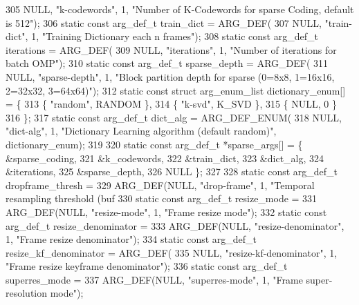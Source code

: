 \begin{DoxyCodeInclude}
{{305     NULL, \textcolor{stringliteral}{"k-codewords"}, 1, \textcolor{stringliteral}{"Number of K-Codewords for sparse Coding, default is 512"});
306 \textcolor{keyword}{static} \textcolor{keyword}{const} arg\_def\_t train\_dict = ARG\_DEF(
307     NULL, \textcolor{stringliteral}{"train-dict"}, 1, \textcolor{stringliteral}{"Training Dictionary each n frames"});
308 \textcolor{keyword}{static} \textcolor{keyword}{const} arg\_def\_t iterations = ARG\_DEF(
309     NULL, \textcolor{stringliteral}{"iterations"}, 1, \textcolor{stringliteral}{"Number of iterations for batch OMP"});
310 \textcolor{keyword}{static} \textcolor{keyword}{const} arg\_def\_t sparse\_depth = ARG\_DEF(
311     NULL, \textcolor{stringliteral}{"sparse-depth"}, 1, \textcolor{stringliteral}{"Block partition depth for sparse (0=8x8, 1=16x16, 2=32x32, 3=64x64)"});
312 \textcolor{keyword}{static} \textcolor{keyword}{const} \textcolor{keyword}{struct }arg\_enum\_list dictionary\_enum[] = \{
313     \{ \textcolor{stringliteral}{"random"}, RANDOM \},
314     \{ \textcolor{stringliteral}{"k-svd"}, K\_SVD \},
315     \{ NULL, 0 \}
316 \};
317 \textcolor{keyword}{static} \textcolor{keyword}{const} arg\_def\_t  dict\_alg = ARG\_DEF\_ENUM(
318     NULL, \textcolor{stringliteral}{"dict-alg"}, 1, \textcolor{stringliteral}{"Dictionary Learning algorithm (default random)"}, dictionary\_enum);
319 
320 \textcolor{keyword}{static} \textcolor{keyword}{const} arg\_def\_t *sparse\_args[] = \{ &sparse\_coding,
321     &k\_codewords,
322     &train\_dict,
323     &dict\_alg,
324     &iterations,
325     &sparse\_depth,
326     NULL \};
327 
328 \textcolor{keyword}{static} \textcolor{keyword}{const} arg\_def\_t dropframe\_thresh =
329     ARG\_DEF(NULL, \textcolor{stringliteral}{"drop-frame"}, 1, \textcolor{stringliteral}{"Temporal resampling threshold (buf %
330 \textcolor{keyword}{static} \textcolor{keyword}{const} arg\_def\_t resize\_mode =
331     ARG\_DEF(NULL, \textcolor{stringliteral}{"resize-mode"}, 1, \textcolor{stringliteral}{"Frame resize mode"});
332 \textcolor{keyword}{static} \textcolor{keyword}{const} arg\_def\_t resize\_denominator =
333     ARG\_DEF(NULL, \textcolor{stringliteral}{"resize-denominator"}, 1, \textcolor{stringliteral}{"Frame resize denominator"});
334 \textcolor{keyword}{static} \textcolor{keyword}{const} arg\_def\_t resize\_kf\_denominator = ARG\_DEF(
335     NULL, \textcolor{stringliteral}{"resize-kf-denominator"}, 1, \textcolor{stringliteral}{"Frame resize keyframe denominator"});
336 \textcolor{keyword}{static} \textcolor{keyword}{const} arg\_def\_t superres\_mode =
337     ARG\_DEF(NULL, \textcolor{stringliteral}{"superres-mode"}, 1, \textcolor{stringliteral}{"Frame super-resolution mode"});
}}}
\end{DoxyCodeInclude}
